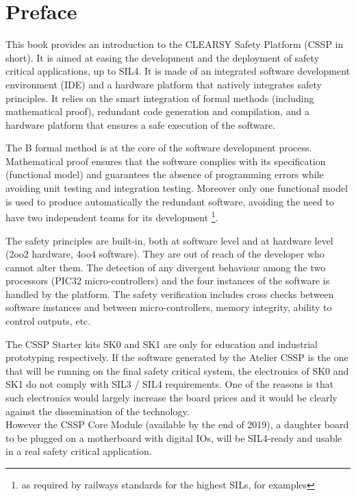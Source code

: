 \chapter{Preface}
\label{preface}

This book provides an introduction to the CLEARSY Safety Platform (CSSP in short).
It is aimed at easing the development and the deployment of safety critical applications, up to SIL4. It is made of an integrated software development environment (IDE) and a hardware platform that natively integrates safety principles.
It relies on the smart integration of formal methods (including mathematical proof), redundant code generation and compilation, and a hardware platform that ensures a safe execution of the software.

The B formal method is at the core of the software development process. Mathematical proof ensures that the software complies with its specification (functional model) and guarantees the absence of programming errors while avoiding unit testing and integration testing. Moreover only one functional model is used to produce automatically the redundant software, avoiding the need to have two independent teams for its development \footnote{as required by railways standards for the highest SILs, for examples}.

The safety principles are built-in, both at software level and at hardware level (2oo2 hardware, 4oo4 software). They are out of reach of the developer who cannot alter them. The detection of any divergent behaviour among the two processors (PIC32 micro-controllers) and the four instances of the software is handled by the platform. The safety verification includes cross checks between software instances and between micro-controllers, memory integrity, ability to control outputs, etc. 

\begin{remark}
The CSSP Starter kits SK0 and SK1 are only for education and industrial prototyping respectively. If the software generated by the Atelier CSSP is the one that will be running on the final safety critical system, the electronics of SK0 and SK1 do not comply with SIL3 / SIL4 requirements. One of the reasons is that such electronics would largely increase the board prices and it would be clearly against the dissemination of the technology. \\
However the CSSP Core Module (available by the end of 2019), a daughter board to be plugged on a motherboard with digital IOs, will be SIL4-ready and usable in a real safety critical application.
\end{remark}

